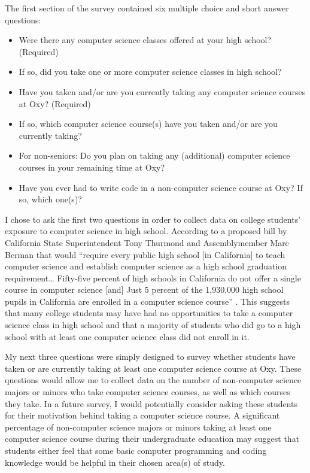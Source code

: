 \documentclass[10pt,twocolumn]{article}
\begin{document}
The first section of the survey contained six multiple choice and short answer questions:
 \begin{itemize}
    \item{Were there any computer science classes offered at your high school? (Required)}
    \item{If so, did you take one or more computer science classes in high school?}
    \item{Have you taken and/or are you currently taking any computer science courses at Oxy? (Required)}
    \item{If so, which computer science course(s) have you taken and/or are you currently taking?}
    \item{For non-seniors: Do you plan on taking any (additional) computer science courses in your remaining time at Oxy?}
    \item{Have you ever had to write code in a non-computer science course at Oxy? If so, which one(s)?}
\end{itemize}

I chose to ask the first two questions in order to collect data on college students’ exposure to computer science in high school. According to a proposed bill by California State Superintendent Tony Thurmond and Assemblymember Marc Berman that would “require every public high school [in California] to teach computer science and establish computer science as a high school graduation requirement… Fifty-five percent of high schools in California do not offer a single course in computer science [and] Just 5 percent of the 1,930,000 high school pupils in California are enrolled in a computer science course” \cite{Bill}. This suggests that many college students may have had no opportunities to take a computer science class in high school and that a majority of students who did go to a high school with at least one computer science class did not enroll in it. 

My next three questions were simply designed to survey whether students have taken or are currently taking at least one computer science course at Oxy. These questions would allow me to collect data on the number of non-computer science majors or minors who take computer science courses, as well as which courses they take. In a future survey, I would potentially consider asking these students for their motivation behind taking a computer science course. A significant percentage of non-computer science majors or minors taking at least one computer science course during their undergraduate education may suggest that students either feel that some basic computer programming and coding knowledge would be helpful in their chosen area(s) of study. 
\end{document}
